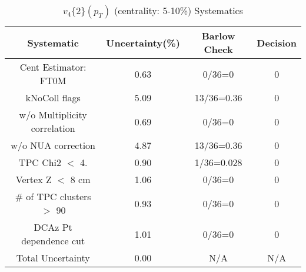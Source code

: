 \begin{table}[htbp]
\caption{$v_4\{2\}(p_{T})$ (centrality: 5-10\%) Systematics}
\label{tab:Sys_pTDiffv4}
\centering
\begin{tabular}{|c|c|c|c|}
\hline
Systematic & Uncertainty(\%) & Barlow Check & Decision \\
\hline
Cent Estimator: FT0M & 0.63 & 0/36=0 & 0 \\
kNoColl flags & 5.09 & 13/36=0.36 & 0 \\
w/o Multiplicity correlation & 0.69 & 0/36=0 & 0 \\
w/o NUA correction & 4.87 & 13/36=0.36 & 0 \\
TPC Chi2 $<$ 4. & 0.90 & 1/36=0.028 & 0 \\
Vertex Z $<$ 8 cm & 1.06 & 0/36=0 & 0 \\
\# of TPC clusters $>$ 90 & 0.93 & 0/36=0 & 0 \\
DCAz Pt dependence cut & 1.01 & 0/36=0 & 0 \\
\hline
Total Uncertainty & 0.00 & N/A & N/A \\
\hline
\end{tabular}
\end{table}
